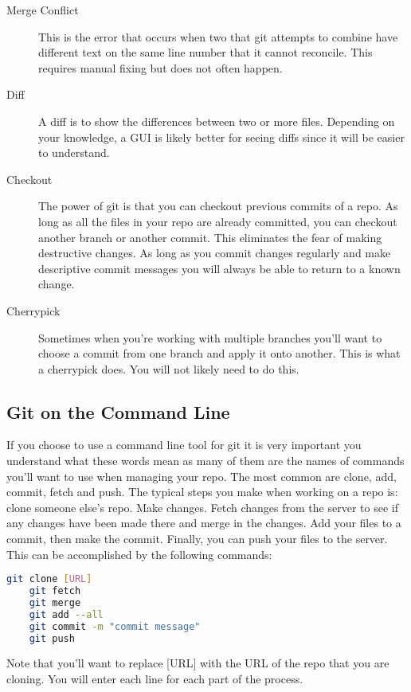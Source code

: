 \begin{description}
	\item[Merge Conflict] This is the error that occurs when two that git attempts to combine have different text on the same line number that it cannot reconcile. This requires manual fixing but does not often happen.
	\item[Diff] A diff is to show the differences between two or more files. Depending on your knowledge, a GUI is likely better for seeing diffs since it will be easier to understand.
	\item[Checkout] The power of git is that you can checkout previous commits of a repo. As long as all the files in your repo are already committed, you can checkout another branch or another commit. This eliminates the fear of making destructive changes. As long as you commit changes regularly and make descriptive commit messages you will always be able to return to a known change.
	\item[Cherrypick] Sometimes when you're working with multiple branches you'll want to choose a commit from one branch and apply it onto another. This is what a cherrypick does. You will not likely need to do this.
\end{description}

\subsection{Git on the Command Line}

If you choose to use a command line tool for git it is very important you understand what these words mean as many of them are the names of commands you'll want to use when managing your repo. The most common are clone, add, commit, fetch and push. The typical steps you make when working on a repo is: clone someone else's repo. Make changes. Fetch changes from the server to see if any changes have been made there and merge in the changes. Add your files to a commit, then make the commit. Finally, you can push your files to the server. This can be accomplished by the following commands:

\begin{lstlisting}[language=bash]
	git clone [URL]
	git fetch
	git merge
	git add --all
	git commit -m "commit message"
	git push
\end{lstlisting}

Note that you'll want to replace [URL] with the URL of the repo that you are cloning. You will enter each line for each part of the process.

